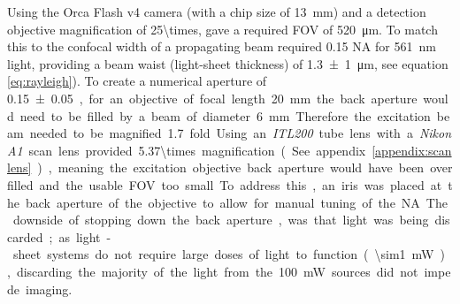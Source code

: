 

Using the Orca Flash v4 camera (with a chip size of \SI{13}{\milli\meter}) and a detection objective magnification of \SI{25\times}{}, gave a required \acrshort{FOV} of \SI{520}{\micro\meter}.
To match this to the confocal width of a propagating beam required 0.15 \acrshort{NA} for \SI{561}{\nano\meter} light, providing a beam waist (light-sheet thickness) of \SI{1.3 \pm 1}{\micro\meter}, see equation \ref{eq:rayleigh}).
To create a numerical aperture of \SI{0.15 \pm 0.05}, for an objective of focal length \SI{20}{\milli\meter} the back aperture would need to be filled by a beam of diameter \SI{6}{\milli\meter}.
Therefore the excitation beam needed to be magnified \SI{1.7}{} fold.

Using an \emph{ITL200} tube lens with a \emph{Nikon A1} scan lens provided \SI{5.37\times} magnification (See appendix \ref{appendix:scanlens}), meaning the excitation objective back aperture would have been overfilled and the usable \acrshort{FOV} too small.
To address this, an iris was placed at the back aperture of the objective to allow for manual tuning of the \acrshort{NA}.
The downside of stopping down the back aperture, was that light was being discarded; as light-sheet systems do not require large doses of light to function (\SI{\sim1}{\milli\watt}), discarding the majority of the light from the \SI{100}{\milli\watt} sources did not impede imaging.



